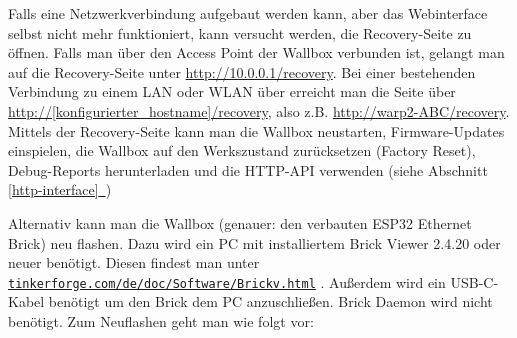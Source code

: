 \documentclass[a4paper,10pt]{article}
\newcommand*{\fullref}[1]{Abschnitt \hyperref[{#1}]{\ref*{#1}~\nameref*{#1}}}
\newcommand\rurl[2]{%
  \href{#1}{\nolinkurl{#2}}%
}
\begin{document}
\begin{multicols*}{2}
    Falls eine Netzwerkverbindung aufgebaut werden kann, aber das Webinterface
	selbst nicht mehr funktioniert, kann versucht werden, die Recovery-Seite zu öffnen.
    Falls man über den Access Point der Wallbox verbunden ist, gelangt man auf
	die Recovery-Seite unter \url{http://10.0.0.1/recovery}. Bei einer bestehenden Verbindung zu einem LAN oder WLAN über
	erreicht man die Seite über \url{http://[konfigurierter_hostname]/recovery}, also z.B. \url{http://warp2-ABC/recovery}.
    Mittels der Recovery-Seite kann man die Wallbox neustarten, Firmware-Updates einspielen,
    die Wallbox auf den Werkszustand zurücksetzen (Factory Reset), Debug-Reports
    herunterladen und die HTTP-API verwenden (siehe \fullref{http-interface})

    Alternativ kann man die Wallbox (genauer: den verbauten ESP32 Ethernet
    Brick) neu flashen.
    Dazu wird ein PC mit installiertem Brick Viewer 2.4.20 oder neuer benötigt.
	Diesen findest man unter \rurl{https://www.tinkerforge.com/de/doc/Software/Brickv.html}{tinkerforge.com/de/doc/Software/Brickv.html}.
    Außerdem wird ein USB-C-Kabel benötigt um den Brick dem PC anzuschließen. Brick Daemon wird nicht benötigt.
    Zum Neuflashen geht man wie folgt vor:



\end{multicols*}
\end{document}
